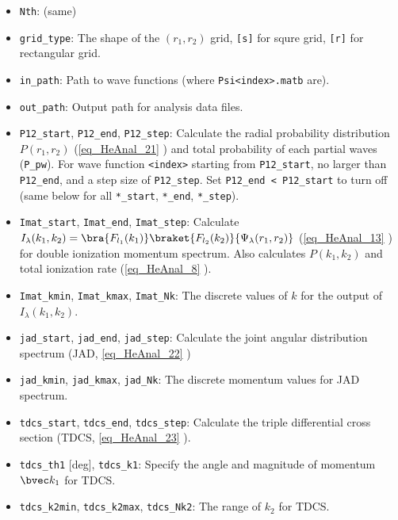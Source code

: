 
\begin{itemize}
\item \verb`Nth`: (same)
\item \verb`grid_type`: The shape of the $(r_1,r_2)$ grid, \verb`[s]` for squre grid, \verb`[r]` for rectangular grid.
\item \verb`in_path`: Path to wave functions (where \verb`Psi<index>.matb` are).
\item \verb`out_path`: Output path for analysis data files.

\item \verb`P12_start`, \verb`P12_end`, \verb`P12_step`: Calculate the radial probability distribution $P(r_1, r_2)$ (\autoref{eq_HeAnal_21} ) and total probability of each partial waves (\verb`P_pw`). For wave function \verb`<index>` starting from \verb`P12_start`, no larger than \verb`P12_end`, and a step size of \verb`P12_step`. Set \verb`P12_end < P12_start` to turn off (same below for all \verb`*_start`, \verb`*_end`, \verb`*_step`).

\item \verb`Imat_start`, \verb`Imat_end`, \verb`Imat_step`: Calculate $I_\lambda(k_1, k_2) = \bra{F_{l_1}(k_1)}\braket{F_{l_2}(k_2)}{\Psi_\lambda(r_1,r_2)}$ (\autoref{eq_HeAnal_13} ) for double ionization momentum spectrum. Also calculates $P(k_1,k_2)$ and total ionization rate (\autoref{eq_HeAnal_8} ).
\item \verb`Imat_kmin`, \verb`Imat_kmax`, \verb`Imat_Nk`: The discrete values of $k$ for the output of $I_\lambda(k_1, k_2)$.
\item \verb`jad_start`, \verb`jad_end`, \verb`jad_step`: Calculate the joint angular distribution spectrum (JAD, \autoref{eq_HeAnal_22} )
\item \verb`jad_kmin`, \verb`jad_kmax`, \verb`jad_Nk`: The discrete momentum values for JAD spectrum.

\item \verb`tdcs_start`, \verb`tdcs_end`, \verb`tdcs_step`: Calculate the triple differential cross section (TDCS, \autoref{eq_HeAnal_23} ).
\item \verb`tdcs_th1` [deg], \verb`tdcs_k1`: Specify the angle and magnitude of momentum $\bvec k_1$ for TDCS.
\item \verb`tdcs_k2min`, \verb`tdcs_k2max`, \verb`tdcs_Nk2`: The range of $k_2$ for TDCS.


\end{itemize}
